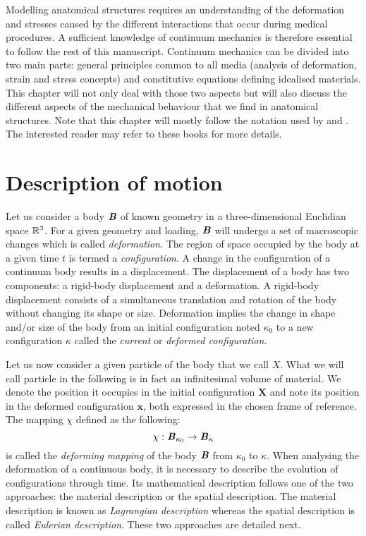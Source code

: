 Modelling anatomical structures requires an understanding of the deformation and stresses caused by the different interactions that occur during medical procedures. A sufficient knowledge of continuum mechanics is therefore essential to follow the rest of this manuscript. Continuum mechanics can be divided into two main parts: general principles common to all media (analysis of deformation, strain and stress concepts) and constitutive equations defining idealised materials. This chapter will not only deal with those two aspects but will also discuss the different aspects of the mechanical behaviour that we find in anatomical structures. Note that this chapter will mostly follow the notation used by \cite{Bonnet97} and \cite{Reddy07}. The interested reader may refer to these books for more details.  


\section{Description of motion}
Let us consider a body $\textbf{\textit{B}}$ of known geometry in a three-dimensional Euclidian space $\mathbb{R}^3$. For a given geometry and loading, $\textbf{\textit{B}}$ will undergo a set of macroscopic changes which is called \emph{deformation}. The region of space occupied by the body at a given time $t$ is termed a \emph{configuration}. A change in the configuration of a continuum body results in a displacement. The displacement of a body has two components: a rigid-body displacement and a deformation. A rigid-body displacement consists of a simultaneous translation and rotation of the body without changing its shape or size. Deformation implies the change in shape and\slash or size of the body from an initial configuration noted $\kappa_{0}$ to a new configuration $\kappa$ called the \emph{current} or \emph{deformed configuration}. 

Let us now consider a given particle of the body that we call $X$. What we will call particle in the following is in fact an infinitesimal volume of material. We denote the position it occupies in the initial configuration $\mathbf{X}$ and note its position in the deformed configuration $\mathbf{x}$, both expressed in the chosen frame of reference. The mapping $\chi$ defined as the following:
\begin{equation}
\label{chap2:mapping}
\chi : \textbf{\textit{B}}_{\kappa_{0}} \rightarrow \textbf{\textit{B}}_{\kappa}
\end{equation} 
is called the \emph{deforming mapping} of the body $\textbf{\textit{B}}$ from $\kappa_{0}$ to $\kappa$. When analysing the deformation of a continuous body, it is necessary to describe the evolution of configurations through time. Its mathematical description follows one of the two approaches: the material description or the spatial description. The material description is known as \emph{Lagrangian description} whereas the spatial description is called \emph{Eulerian description}. These two approaches are detailed next. 

